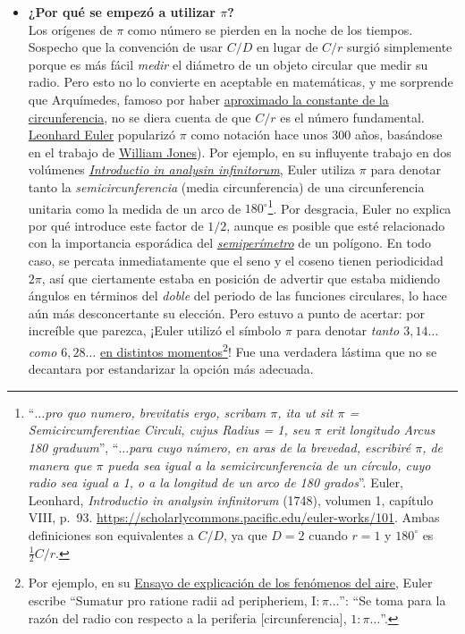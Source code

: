 \begin{itemize}
  \item \textbf{¿Por qué se empezó a utilizar $\pi$?} \\ Los orígenes de $\pi$ como número se pierden en la noche de los tiempos. Sospecho que la convención de usar $C/D$ en lugar de $C/r$ surgió simplemente porque es más fácil \emph{medir} el diámetro de un objeto circular que medir su radio. Pero esto no lo convierte en aceptable en matemáticas, y me sorprende que Arquímedes, famoso por haber \href{http://itech.fgcu.edu/faculty/clindsey/mhf4404/archimedes/archimedes.html}{aproximado la constante de la circunferencia}, no se diera cuenta de que $C/r$ es el número fundamental. \href{https://es.wikipedia.org/wiki/Leonhard_Euler}{Leonhard Euler} popularizó $\pi$ como notación hace unos 300 años, basándose en el trabajo de \href{https://es.wikipedia.org/wiki/William_Jones_(matemático)}{William Jones}). Por ejemplo, en su influyente trabajo en dos volúmenes \href{https://es.wikipedia.org/wiki/Introductio_in_analysin_infinitorum}{\emph{Introductio in analysin infinitorum}}, Euler utiliza $\pi$ para denotar tanto la \emph{semicircunferencia} (media circunferencia) de una circunferencia unitaria como la medida de un arco de $180^\circ$\footnote{``\emph{$\ldots$pro quo numero, brevitatis ergo, scribam $\pi$, ita ut sit $\pi$ = Semicircumferentiae Circuli, cujus Radius = 1, seu $\pi$ erit longitudo Arcus 180 graduum}'', ``\emph{$\ldots$para cuyo número, en aras de la brevedad, escribiré $\pi$, de manera que $\pi$ pueda sea igual a la semicircunferencia de un círculo, cuyo radio sea igual a 1, o a la longitud de un arco de 180 grados}''. Euler, Leonhard, \emph{Introductio in analysin infinitorum} (1748), volumen 1, capítulo VIII, p.~93. \href{https://scholarlycommons.pacific.edu/euler-works/101}{https://scholarlycommons.pacific.edu/euler-works/101}. Ambas definiciones son equivalentes a $C/D$, ya que $D=2$ cuando $r=1$ y $180^\circ$ es $\frac{1}{2}C/r$.}. Por desgracia, Euler no explica por qué introduce este factor de $1/2$, aunque es posible que esté relacionado con la importancia esporádica del \href{https://es.wikipedia.org/wiki/Semiper%C3%ADmetro}{\emph{semiperímetro}} de un polígono. En todo caso, se percata inmediatamente que el seno y el coseno tienen periodicidad $2\pi$, así que ciertamente estaba en posición de advertir que estaba midiendo ángulos en términos del \emph{doble} del periodo de las funciones circulares, lo hace aún más desconcertante su elección. Pero estuvo a punto de acertar: por increíble que parezca, ¡Euler utilizó el símbolo $\pi$ para denotar \emph{tanto $3,14\ldots$ como $6,28\ldots$} \href{https://en.wikipedia.org/wiki/Pi#Adoption_of_the_symbol_%CF%80}{en distintos momentos}\footnote{Por ejemplo, en su \href{http://eulerarchive.maa.org/docs/originals/E007.pdf#page=5}{Ensayo de explicación de los fenómenos del aire}, Euler escribe ``Sumatur pro ratione radii ad peripheriem, $\mathrm{I} : \pi\ldots$'': ``Se toma para la razón del radio con respecto a la periferia [circunferencia], $1: \pi\ldots$''.}! Fue una verdadera lástima que no se decantara por estandarizar la opción más adecuada.


\end{itemize}
